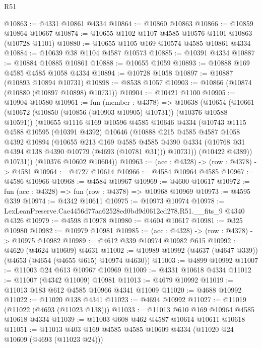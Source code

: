 \begin{lexlean}{R51}
\begin{coremodule}
@10863 := @4331 @10861 @4334
@10864 := @10860 @10863
@10866 := @10859 @10864 @10667
@10874 := @10655 @1102 @1107 @4585 @10576 @1101 @10863 (@10728 @1101)
@10880 := @10655 @1105 @169 @10574 @4585 @10861 @4334
@10884 := @10639 @38 @1104 @4587 @10573
@10885 := @10391 @4334
@10887 := @10884 @10885 @10861
@10888 := @10655 @1059
@10893 := @10888 @169 @4585 @4585 @1058 @4334
@10894 := @10728 @1058
@10897 := @10887 (@10893 @10894 @10731)
@10898 := @8538 @1057
@10903 := @10866 (@10874 (@10880 (@10897 @10898) @10731))
@10904 := @10421 @1100
@10905 := @10904 @10580
@10961 := fun (member : @4378) =>
  @10638
    (@10654
      (@10661
        (@10672 (@10850 (@10856 (@10903 @10905) @10731)) (@10376 @10588 @10591))
        (@10655
          @1116
          @169
          @10596
          @4585
          @10646
          @4334
          (@10743
            @1115
            @4588
            @10595
            (@10391 @4392)
            @10646
            (@10888
              @215
              @4585
              @4587
              @1058
              @4392
              @10894
              (@10655
                @213
                @169
                @4585
                @4585
                @4390
                @4334
                (@10768 @31 @4394 @138 @4390 @10779 (@4693 (@10781 @31)))
                @10731))
            (@10422 @4389))
          @10731))
      (@10376 @10602 @10604))
@10963 := (acc : @4328) -> (row : @4378) -> @4581
@10964 := @4727 @10614
@10966 := @4584 @10964 @4585
@10967 := @4586 @10966
@10968 := @4584 @10967
@10969 := @4600 @10617
@10972 := fun (acc : @4328) => fun (row : @4378) => @10968 @10969
@10973 := @4595 @339
@10974 := @4342 @10611
@10975 := @10973 @10974
@10978 := LexLeanPreserve.Cae4456d77aa62528ed0bd9d0612cd278.R51.__fits_9 @4340 @4326
@10979 := @4598 @10978
@10980 := @4604 @10617
@10981 := @325 @10980
@10982 := @10979 @10981
@10985 := (acc : @4328) -> (row : @4378) -> @10975 @10982
@10989 := @4612 @339 @10974 @10982 @615
@10992 := @4620 (@4624 @10609) @4631
@11002 := @10989 @10992 (@4637 (@4647 @339)) (@4653 (@4654 (@4655 @615) @10974 @4630))
@11003 := @4899 @10992
@11007 := @11003 @24 @613 @10967 @10969
@11009 := @4331 @10618 @4334
@11012 := @11007 (@4342 @11009) @10981
@11013 := @4679 @10992
@11019 := @11013 @183 @612 @4585 @10966 @4341 @11009
@11020 := @4688 @10992
@11022 := @11020 @138 @4341
@11023 := @4694 @10992
@11027 := @11019 (@11022 (@4693 (@11023 @138)))
@11033 := @11013 @610 @169 @10964 @4585 @10618 @4334
@11039 := @11003 @608 @462 @4587 @10614 @10611 @10618
@11051 := @11013 @403 @169 @4585 @4585 @10609 @4334 (@11020 @24 @10609 (@4693 (@11023 @24)))

\end{coremodule}
\end{lexlean}
